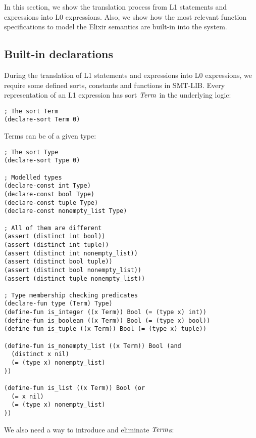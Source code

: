 In this section, we show the translation process from L1 statements and
expressions into L0 expressions. Also, we show how the most relevant function
specifications to model the Elixir semantics are built-in into the system.

\subsection{Built-in declarations}

During the translation of L1 statements and expressions into L0 expressions, we 
require some defined sorts, constants and functions in SMT-LIB. Every representation
of an L1 expression has sort $\mathit{Term}$ in the underlying logic:

\begin{verbatim}
; The sort Term
(declare-sort Term 0)
\end{verbatim}

Terms can be of a given type:

\begin{verbatim}
; The sort Type
(declare-sort Type 0)

; Modelled types
(declare-const int Type)
(declare-const bool Type)
(declare-const tuple Type)
(declare-const nonempty_list Type)

; All of them are different
(assert (distinct int bool))
(assert (distinct int tuple))
(assert (distinct int nonempty_list))
(assert (distinct bool tuple))
(assert (distinct bool nonempty_list))
(assert (distinct tuple nonempty_list))

; Type membership checking predicates
(declare-fun type (Term) Type)
(define-fun is_integer ((x Term)) Bool (= (type x) int))
(define-fun is_boolean ((x Term)) Bool (= (type x) bool))
(define-fun is_tuple ((x Term)) Bool (= (type x) tuple))

(define-fun is_nonempty_list ((x Term)) Bool (and
  (distinct x nil) 
  (= (type x) nonempty_list)
))

(define-fun is_list ((x Term)) Bool (or 
  (= x nil) 
  (= (type x) nonempty_list)
))
\end{verbatim}

We also need a way to introduce and eliminate $\mathit{Term}$s:

